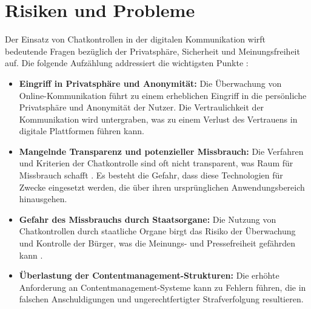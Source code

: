 \documentclass[a4paper]{article}
\begin{document}
\section{Risiken und Probleme}
Der Einsatz von Chatkontrollen in der digitalen Kommunikation wirft bedeutende Fragen bezüglich der Privatsphäre, Sicherheit und Meinungsfreiheit auf. Die folgende Aufzählung addressiert die wichtigsten Punkte \cite{privacy_technology}: 
\begin{itemize}
  \item \textbf{Eingriff in Privatsphäre und Anonymität:} Die Überwachung von Online-Kommunikation führt zu einem erheblichen Eingriff in die persönliche Privatsphäre und Anonymität der Nutzer. Die Vertraulichkeit der Kommunikation wird untergraben, was zu einem Verlust des Vertrauens in digitale Plattformen führen kann.

  \item \textbf{Mangelnde Transparenz und potenzieller Missbrauch:} Die Verfahren und Kriterien der Chatkontrolle sind oft nicht transparent, was Raum für Missbrauch schafft \cite{bugs_in_our_pockets}. Es besteht die Gefahr, dass diese Technologien für Zwecke eingesetzt werden, die über ihren ursprünglichen Anwendungsbereich hinausgehen.


  \item \textbf{Gefahr des Missbrauchs durch Staatsorgane:} Die Nutzung von Chatkontrollen durch staatliche Organe birgt das Risiko der Überwachung und Kontrolle der Bürger, was die Meinungs- und Pressefreiheit gefährden kann \cite{letter_chatcontrol}.
  
  \item \textbf{Überlastung der Contentmanagement-Strukturen:} Die erhöhte Anforderung an Contentmanagement-Systeme kann zu Fehlern führen, die in falschen Anschuldigungen und ungerechtfertigter Strafverfolgung resultieren.
  

\end{itemize}
\end{document}
